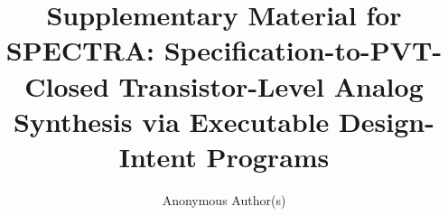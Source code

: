 \documentclass[sigconf,review,anonymous]{acmart}
\begin{document}
\title[Supplementary Material for SPECTRA]{Supplementary Material for SPECTRA: Specification-to-PVT-Closed Transistor-Level Analog Synthesis via Executable Design-Intent Programs}
\author{Anonymous Author(s)}
\maketitle



\clearpage

\renewcommand{\bibfont}{\fontsize{6.4}{7.2}\selectfont}
\setlength{\bibsep}{0.5pt}

\end{document}
